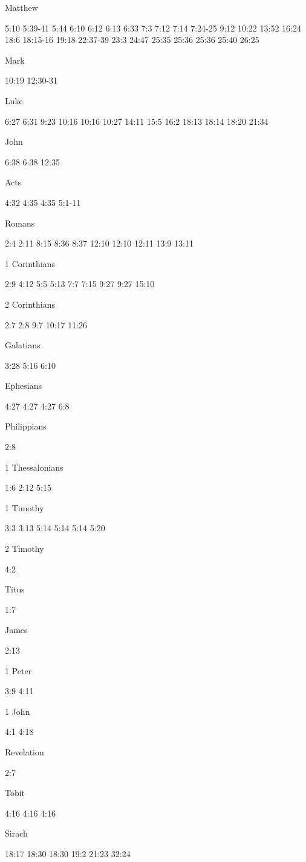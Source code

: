 Matthew

5:10 5:39-41 5:44 6:10 6:12 6:13 6:33 7:3 7:12 7:14 7:24-25 9:12 10:22 13:52 16:24 18:6 18:15-16 19:18 22:37-39 23:3 24:47 25:35 25:36 25:36 25:40 26:25

Mark

10:19 12:30-31

Luke

6:27 6:31 9:23 10:16 10:16 10:27 14:11 15:5 16:2 18:13 18:14 18:20 21:34

John

6:38 6:38 12:35

Acts

4:32 4:35 4:35 5:1-11

Romans

2:4 2:11 8:15 8:36 8:37 12:10 12:10 12:11 13:9 13:11

1 Corinthians

2:9 4:12 5:5 5:13 7:7 7:15 9:27 9:27 15:10

2 Corinthians

2:7 2:8 9:7 10:17 11:26

Galatians

3:28 5:16 6:10

Ephesians

4:27 4:27 4:27 6:8

Philippians

2:8

1 Thessalonians

1:6 2:12 5:15

1 Timothy

3:3 3:13 5:14 5:14 5:14 5:20

2 Timothy

4:2

Titus

1:7

James

2:13

1 Peter

3:9 4:11

1 John

4:1 4:18

Revelation

2:7

Tobit

4:16 4:16 4:16

Sirach

18:17 18:30 18:30 19:2 21:23 32:24
